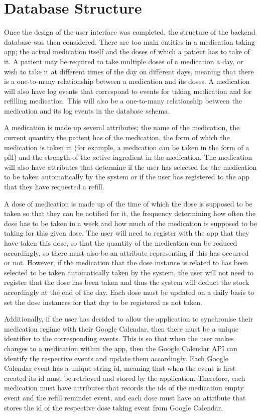 \documentclass{l4proj}
\begin{document}
 
\section{Database Structure}

Once the design of the user interface was completed, the structure of the backend database was then considered. There are too main entities in a medication taking app; the actual medication itself and the doses of which a patient has to take of it. A patient may be required to take multiple doses of a medication a day, or wish to take it at different times of the day on different days, meaning that there is a one-to-many relationship between a medication and its doses. A medication will also have log events that correspond to events for taking medication and for refilling medication. This will also be a one-to-many relationship between the medication and its log events in the database schema.

A medication is made up several attributes; the name of the medication, the current quantity the patient has of the medication, the form of which the medication is taken in (for example, a medication can be taken in the form of a pill) and the strength of the active ingredient in the medication. The medication will also have attributes that determine if the user has selected for the medication to be taken automatically by the system or if the user has registered to the app that they have requested a refill.

A dose of medication is made up of the time of which the dose is supposed to be taken so that they can be notified for it, the frequency determining how often the dose has to be taken in a week and how much of the medication is supposed to be taking for this given dose. The user will need to register with the app that they have taken this dose, so that the quantity of the medication can be reduced accordingly, so there must also be an attribute representing if this has occurred or not. However, if the medication that the dose instance is related to has been selected to be taken automatically taken by the system, the user will not need to register that the dose has been taken and thus the system will deduct the stock accordingly at the end of the day. Each dose must be updated on a daily basis to set the dose instances for that day to be registered as not taken. 

Additionally, if the user has decided to allow the application to synchronise their medication regime with their Google Calendar, then there must be a unique identifier to the corresponding events. This is so that when the user makes changes to a medication within the app, then the Google Calendar API can identify the respective events and update them accordingly. Each Google Calendar event has a unique string id, meaning that when the event is first created its id must be retrieved and stored by the application. Therefore, each medication must have attributes that records the ids of the medication empty event and the refill reminder event, and each dose must have an attribute that stores the id of the respective dose taking event from Google Calendar.
\end{document}
